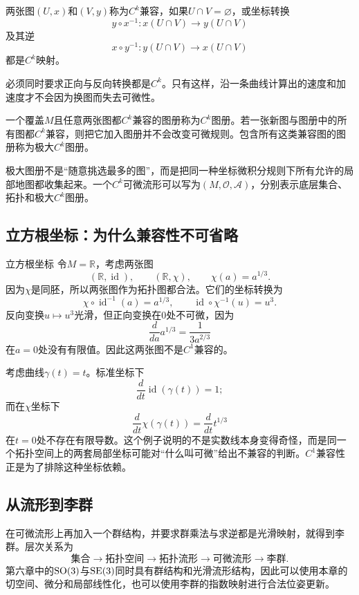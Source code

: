 \begin{definition}[$C^k$兼容]
两张图$(U,x)$和$(V,y)$称为$C^k$兼容，如果$U\cap V=\varnothing$，或坐标转换
\[
    y\circ x^{-1}:x(U\cap V)\to y(U\cap V)
\]
及其逆
\[
    x\circ y^{-1}:y(U\cap V)\to x(U\cap V)
\]
都是$C^k$映射。
\end{definition}

必须同时要求正向与反向转换都是$C^k$。只有这样，沿一条曲线计算出的速度和加速度才不会因为换图而失去可微性。

\begin{definition}[$C^k$图册与极大图册]
一个覆盖$M$且任意两张图都$C^k$兼容的图册称为$C^k$图册。若一张新图与图册中的所有图都$C^k$兼容，则把它加入图册并不会改变可微规则。包含所有这类兼容图的图册称为极大$C^k$图册。
\end{definition}

极大图册不是“随意挑选最多的图”，而是把同一种坐标微积分规则下所有允许的局部地图都收集起来。一个$C^k$可微流形可以写为$(M,\mathcal O,\mathcal A)$，分别表示底层集合、拓扑和极大$C^k$图册。

\subsection{立方根坐标：为什么兼容性不可省略}

\begin{slamcase}{立方根坐标}
令$M=\mathbb R$，考虑两张图
\[
    (\mathbb R,\operatorname{id}),
    \qquad
    (\mathbb R,\chi),
    \qquad
    \chi(a)=a^{1/3}.
\]
因为$\chi$是同胚，所以两张图作为拓扑图都合法。它们的坐标转换为
\[
    \chi\circ\operatorname{id}^{-1}(a)=a^{1/3},
    \qquad
    \operatorname{id}\circ\chi^{-1}(u)=u^3.
\]
反向变换$u\mapsto u^3$光滑，但正向变换在$0$处不可微，因为
\[
    \frac{d}{da}a^{1/3}=\frac{1}{3a^{2/3}}
\]
在$a=0$处没有有限值。因此这两张图不是$C^1$兼容的。

考虑曲线$\gamma(t)=t$。标准坐标下
\[
    \frac{d}{dt}\operatorname{id}(\gamma(t))=1;
\]
而在$\chi$坐标下
\[
    \frac{d}{dt}\chi(\gamma(t))=\frac{d}{dt}t^{1/3}
\]
在$t=0$处不存在有限导数。这个例子说明的不是实数线本身变得奇怪，而是同一个拓扑空间上的两套局部坐标可能对“什么叫可微”给出不兼容的判断。$C^1$兼容性正是为了排除这种坐标依赖。
\end{slamcase}

\subsection{从流形到李群}

在可微流形上再加入一个群结构，并要求群乘法与求逆都是光滑映射，就得到李群。层次关系为
\[
\text{集合}
\to\text{拓扑空间}
\to\text{拓扑流形}
\to\text{可微流形}
\to\text{李群}.
\]
第六章中的$\operatorname{SO}(3)$与$\operatorname{SE}(3)$同时具有群结构和光滑流形结构，因此可以使用本章的切空间、微分和局部线性化，也可以使用李群的指数映射进行合法位姿更新。

